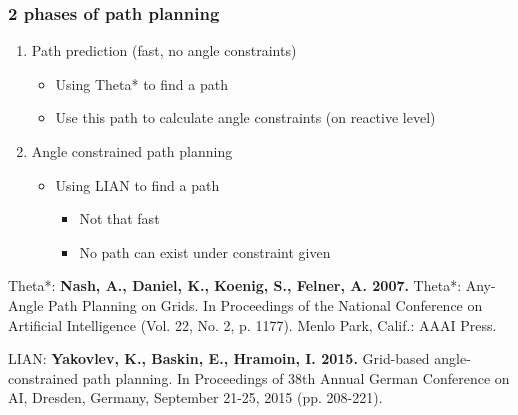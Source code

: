 \documentclass[default]{beamer}
\begin{document}
	\begin{frame}
		\frametitle{2 phases of path planning}

		\begin{minipage}[t][.6\textheight]{\textwidth}		
			\begin{enumerate}
				\item Path prediction (fast, no angle constraints)
				\begin{itemize}
					\item Using Theta* to find a path
					\item Use this path to calculate angle constraints (on reactive level)
				\end{itemize}
				\item Angle constrained path planning
				\begin{itemize}
					\item Using LIAN to find a path
					\begin{itemize}
						\item Not that fast
						\item No path can exist under constraint given
					\end{itemize}
				\end{itemize}
			\end{enumerate}
			
			\vfill
			
			\fontsize{6}{7.2}\selectfont
			Theta*: \textbf{Nash, A., Daniel, K., Koenig, S., Felner, A. 2007.} Theta*: Any-Angle Path Planning on Grids. In Proceedings of the National Conference on Artificial Intelligence (Vol. 22, No. 2, p. 1177). Menlo Park, Calif.: AAAI Press.
			\par\medskip
			LIAN: \textbf{Yakovlev, K., Baskin, E., Hramoin, I. 2015.} Grid-based angle-constrained path planning. In Proceedings of 38th Annual German Conference on AI, Dresden, Germany, September 21-25, 2015 (pp. 208-221).
		\end{minipage}
	\end{frame}
\end{document}
